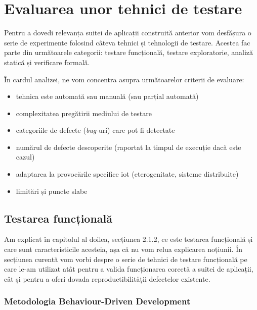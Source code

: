 \chapter{Evaluarea unor tehnici de testare}

Pentru a dovedi relevanța suitei de aplicații construită anterior vom desfășura o serie de experimente folosind câteva tehnici și tehnologii de testare. Acestea fac parte din următoarele categorii: testare funcțională, testare exploratorie, analiză statică și verificare formală.

În cardul analizei, ne vom concentra asupra următoarelor criterii de evaluare:

\begin{itemize}
    \item tehnica este automată sau manuală (sau parțial automată)
    \item complexitatea pregătirii mediului de testare
    \item categoriile de defecte (\textit{bug}-uri) care pot fi detectate
    \item numărul de defecte descoperite (raportat la timpul de execuție dacă este cazul)
    \item adaptarea la provocările specifice \acrshort{iot} (eterogenitate, sisteme distribuite)
    \item limitări și puncte slabe
\end{itemize} 

\section{Testarea funcțională}

Am explicat în capitolul al doilea, secțiunea 2.1.2, ce este testarea funcțională și care sunt caracteristicile acesteia, așa că nu vom relua explicarea noțiunii. În secțiunea curentă vom vorbi despre o serie de tehnici de testare funcțională pe care le-am utilizat atât pentru a valida funcționarea corectă a suitei de aplicații, cât și pentru a oferi dovada reproductibilității defectelor existente.


\subsection*{Metodologia Behaviour-Driven Development}
\label{cap:testare_bdd}

